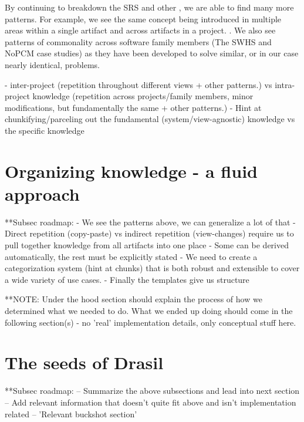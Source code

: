 By continuing to breakdown the SRS and other \sfs{}, we are able to find many 
more patterns. For example, we see the same concept being introduced in 
multiple areas within a single artifact and across artifacts in a project. 
. We 
also see patterns of commonality across software family members (The SWHS and 
NoPCM case studies) as they have been developed to solve similar, or in our 
case nearly identical, problems.

- inter-project (repetition throughout different views + other patterns.)
  vs intra-project knowledge (repetition across projects/family members,
  minor modifications, but fundamentally the same + other patterns.)
- Hint at chunkifying/parceling out the fundamental (system/view-agnostic)
knowledge vs the specific knowledge


\section{Organizing knowledge - a fluid approach}
  **Subsec roadmap:
    - We see the patterns above, we can generalize a lot of that
    - Direct repetition (copy-paste) vs indirect repetition (view-changes)
    require us to pull together knowledge from all artifacts into one place
    - Some can be derived automatically, the rest must be explicitly stated
    - We need to create a categorization system (hint at chunks) that is both
    robust and extensible to cover a wide variety of use cases.
    - Finally the templates give us structure

  **NOTE: Under the hood section should explain the process of how we determined
  what we needed to do. What we ended up doing should come in the following
  section(s) - no 'real' implementation details, only conceptual stuff here.
  
\section{The seeds of Drasil}
  **Subsec roadmap:
    -- Summarize the above subsections and lead into next section
    -- Add relevant information that doesn't quite fit above 
      and isn't implementation related
    -- 'Relevant buckshot section'
